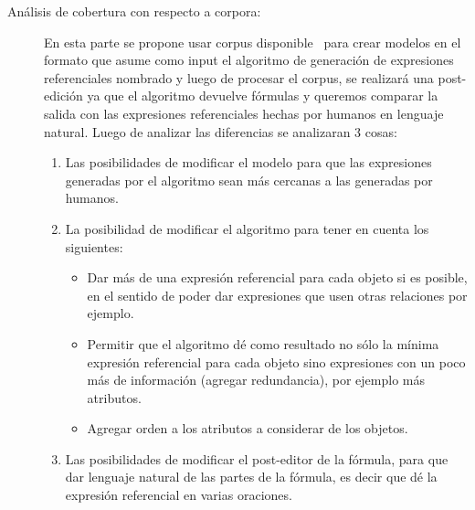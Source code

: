 \begin{description}
\item[An\'alisis de cobertura con respecto a corpora:] En esta parte se propone usar corpus disponible~\cite{viethen-dale:2011:UCNLG+Eval} para crear modelos en el formato que asume como input el algoritmo de generaci\'on de expresiones referenciales nombrado y luego de procesar el corpus, se realizar\'a una post-edici\'on ya que el algoritmo devuelve f\'ormulas y queremos comparar la salida con las expresiones referenciales hechas por humanos en lenguaje natural.
Luego de analizar las diferencias se analizaran 3 cosas:
\begin{enumerate}
\item Las posibilidades de modificar el modelo para que las expresiones generadas por el algoritmo sean m\'as cercanas a las generadas por humanos.
\item La posibilidad de modificar el algoritmo para tener en cuenta los siguientes:
  \begin{itemize}
   \item Dar m\'as de una expresi\'on referencial para cada objeto si es posible, en el sentido de poder dar expresiones que usen otras relaciones por ejemplo.
   \item Permitir que el algoritmo d\'e como resultado no s\'olo la m\'inima expresi\'on referencial para cada objeto sino expresiones con un poco m\'as de informaci\'on (agregar redundancia), por ejemplo m\'as atributos.
   \item Agregar orden a los atributos a considerar de los objetos.
  \end{itemize}
\item Las posibilidades de modificar el post-editor de la f\'ormula, para que dar lenguaje natural de las partes de la f\'ormula, es decir que d\'e la expresi\'on referencial en varias oraciones.
\end{enumerate}

\end{description}
